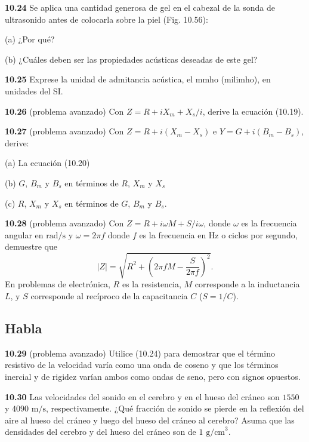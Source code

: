 \documentclass[12pt]{book}
\begin{document}
\FloatBarrier

\noindent \textbf{10.24} Se aplica una cantidad generosa de gel en el cabezal de la sonda de ultrasonido antes de colocarla sobre la piel (Fig. 10.56):

(a) ¿Por qué?

(b) ¿Cuáles deben ser las propiedades acústicas deseadas de este gel?

\noindent \textbf{10.25} Exprese la unidad de admitancia acústica, el $\text{mmho}$ (milimho), en unidades del SI.

\noindent \textbf{10.26} (problema avanzado) Con $Z = R + iX_m + X_s/i$, derive la ecuación (10.19).

\noindent \textbf{10.27} (problema avanzado) Con $Z = R + i(X_m - X_s)$ e $Y = G + i(B_m - B_s)$, derive:

(a) La ecuación (10.20)

(b) $G$, $B_m$ y $B_s$ en términos de $R$, $X_m$ y $X_s$

(c) $R$, $X_m$ y $X_s$ en términos de $G$, $B_m$ y $B_s$.

\noindent \textbf{10.28} (problema avanzado) Con $Z = R + i\omega M + S/i\omega$, donde $\omega$ es la frecuencia angular en $\text{rad/s}$ y $\omega = 2\pi f$ donde $f$ es la frecuencia en $\text{Hz}$ o ciclos por segundo, demuestre que
\begin{equation}
|Z| = \sqrt{R^2 + \left(2\pi f M - \frac{S}{2\pi f}\right)^2}.
\label{eq:10.67}
\end{equation}
En problemas de electrónica, $R$ es la resistencia, $M$ corresponde a la inductancia $L$, y $S$ corresponde al recíproco de la capacitancia $C$ ($S = 1/C$).


\subsection*{Habla}

\noindent \textbf{10.29} (problema avanzado) Utilice (10.24) para demostrar que el término resistivo de la velocidad varía como una onda de coseno y que los términos inercial y de rigidez varían ambos como ondas de seno, pero con signos opuestos.

\noindent \textbf{10.30} Las velocidades del sonido en el cerebro y en el hueso del cráneo son $1550$ y $4090\text{ m/s}$, respectivamente. ¿Qué fracción de sonido se pierde en la reflexión del aire al hueso del cráneo y luego del hueso del cráneo al cerebro? Asuma que las densidades del cerebro y del hueso del cráneo son de $1\text{ g/cm}^3$.
\end{document}
